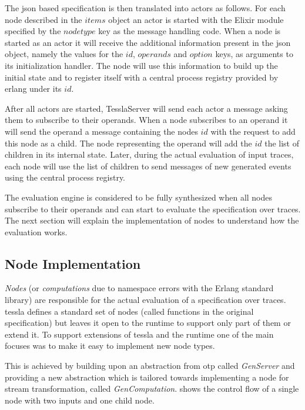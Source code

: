 The \gls{json} based specification is then translated into actors as follows.
For each node described in the \(\mathit{items}\) object an actor is started with the Elixir module specified by the \(\mathit{nodetype}\) key as the message handling code.
When a node is started as an actor it will receive the additional information present in the \gls{json} object, namely the values for the \(\mathit{id}\), \(\mathit{operands}\) and \(\mathit{option}\) keys, as arguments to its initialization handler.
The node will use this information to build up the initial state and to register itself with a central process registry provided by erlang under its \(\mathit{id}\).

After all actors are started, TesslaServer will send each actor a message asking them to subscribe to their operands.
When a node subscribes to an operand it will send the operand a message containing the nodes \(\mathit{id}\) with the request to add this node as a child.
The node representing the operand will add the \(\mathit{id}\) the list of children in its internal state.
Later, during the actual evaluation of input traces, each node will use the list of children to send messages of new generated events using the central process registry.

The evaluation engine is considered to be fully synthesized when all nodes subscribe to their operands and can start to evaluate the specification over traces.
The next section will explain the implementation of nodes to understand how the evaluation works.

\subsection{Node Implementation}
\label{sec:implementation:tesslaserver:nodes}

\emph{Nodes} (or \emph{computations} due to namespace errors with the Erlang standard library) are responsible for the actual evaluation of a specification over traces.
\Gls{tessla} defines a standard set of nodes (called functions in the original specification) but leaves it open to the runtime to support only part of them or extend it.
To support extensions of \gls{tessla} and the runtime one of the main focuses was to make it easy to implement new node types.

This is achieved by building upon an abstraction from \gls{otp} called \emph{GenServer} and providing a new abstraction which is tailored towards implementing a node for stream transformation, called \emph{GenComputation}.
 shows the control flow of a single node with two inputs and one child node.

